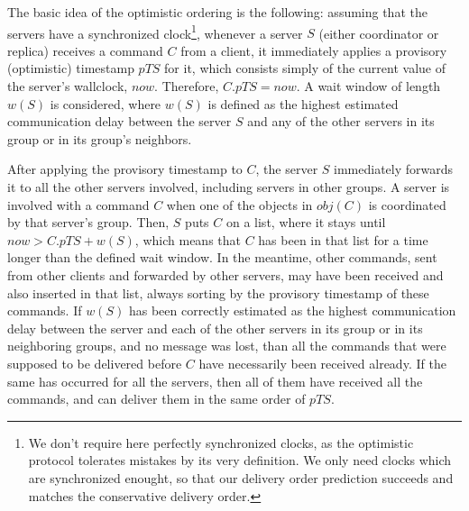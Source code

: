 \documentclass[times, 10pt]{article}
\begin{document}


The basic idea of the optimistic ordering is the following: assuming that the servers have a synchronized clock\footnote{We don't require here perfectly synchronized clocks, as the optimistic protocol tolerates mistakes by its very definition. We only need clocks which are synchronized enought, so that our delivery order prediction succeeds and matches the conservative delivery order.}, whenever a server $S$ (either coordinator or replica) receives a command $C$ from a client, it immediately applies a provisory (optimistic) timestamp $pTS$ for it, which consists simply of the current value of the server's wallclock, $now$. Therefore, $C.pTS=now$. A wait window of length $w(S)$ is considered, where $w(S)$ is defined as the highest estimated communication delay between the server $S$ and any of the other servers in its group or in its group's neighbors.

After applying the provisory timestamp to $C$, the server $S$ immediately forwards it to all the other servers involved, including servers in other groups. A server is involved with a command $C$ when one of the objects in $obj(C)$ is coordinated by that server's group. Then, $S$ puts $C$ on a list, where it stays until $now>C.pTS+w(S)$, which means that $C$ has been in that list for a time longer than the defined wait window. In the meantime, other commands, sent from other clients and forwarded by other servers, may have been received and also inserted in that list, always sorting by the provisory timestamp of these commands. If $w(S)$ has been correctly estimated as the highest communication delay between the server and each of the other servers in its group or in its neighboring groups, and no message was lost, than all the commands that were supposed to be delivered before $C$ have necessarily been received already. If the same has occurred for all the servers, then all of them have received all the commands, and can deliver them in the same order of $pTS$.
\end{document}
